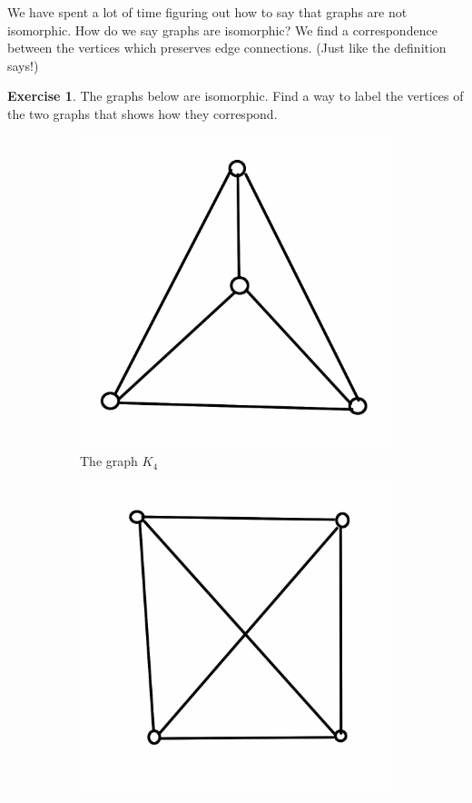 \documentclass[12pt,letterpaper]{article}
\theoremstyle{definition}
\newtheorem{exercise}[question]{Exercise}
\begin{document}
We have spent a lot of time figuring out how to say that graphs are not isomorphic. How do we say graphs are
isomorphic? We find a correspondence between the vertices which preserves edge connections. 
(Just like the definition says!)

\begin{exercise}
The graphs below are isomorphic. Find a way to label the vertices of the two graphs that shows how they correspond.
\begin{figure}[h]
\centering
\begin{subfigure}[b]{0.4\textwidth}
\includegraphics[width=\textwidth]{images/std_k4.png}
\caption{The graph $K_4$}
\end{subfigure}
\qquad
\begin{subfigure}[b]{0.4\textwidth}
\includegraphics[width=\textwidth]{images/altk4.png}

\end{subfigure}
\end{figure}
\end{exercise}
\end{document}
